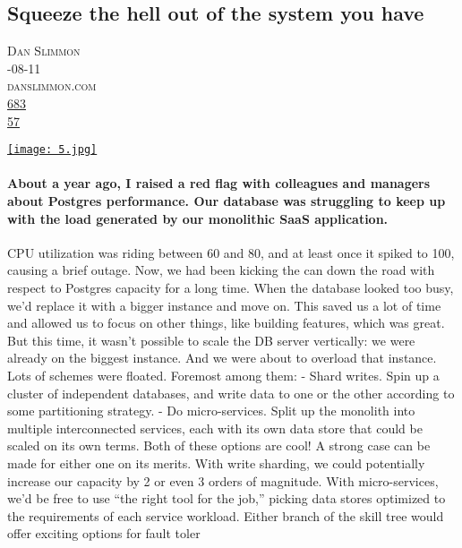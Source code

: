 \documentclass[10pt,a4paper]{article}
\begin{document}
\subsection{Squeeze the hell out of the system you have}
\noindent\begin{minipage}[t]{0.20\linewidth}
\vspace{0pt}
\noindent\textsc{\footnotesize
{\scriptsize\faUser}\space 
Dan Slimmon \\
{\scriptsize\faCalendar}-08-11 \\
{\scriptsize\faGlobe}\space 
danslimmon.com \\
{\scriptsize\faThumbsOUp}\space 
\href{http://news.ycombinator.com/item?id=37091983\&utm\_term=comment}{683} \\
{\scriptsize\faComments}\space 
\href{http://news.ycombinator.com/item?id=37091983\&utm\_term=comment}{57} \\
}
\end{minipage} %
\begin{minipage}[t]{0.80\linewidth}
\vspace{0pt}
\begin{multicols}{2}

    \href{https://blog.danslimmon.com/2023/08/11/squeeze-the-hell-out-of-the-system-you-have/\#like-2777?utm\_source=hackernewsletter\&utm\_medium=email\&utm\_term=fav}{
        \texttt{[image: 5.jpg]}
    }
  
\paragraph{About a year ago, I raised a red flag with colleagues and managers about Postgres performance. Our database was struggling to keep up with the load generated by our monolithic SaaS application.}
 CPU utilization was riding between 60 and 80, and at least once it spiked to 100, causing a brief outage.
Now, we had been kicking the can down the road with respect to Postgres capacity for a long time. When the database looked too busy, we’d replace it with a bigger instance and move on. This saved us a lot of time and allowed us to focus on other things, like building features, which was great.
But this time, it wasn’t possible to scale the DB server vertically: we were already on the biggest instance. And we were about to overload that instance.
Lots of schemes were floated. Foremost among them:
- Shard writes. Spin up a cluster of independent databases, and write data to one or the other according to some partitioning strategy.
- Do micro-services. Split up the monolith into multiple interconnected services, each with its own data store that could be scaled on its own terms.
Both of these options are cool! A strong case can be made for either one on its merits. With write sharding, we could potentially increase our capacity by 2 or even 3 orders of magnitude. With micro-services, we’d be free to use “the right tool for the job,” picking data stores optimized to the requirements of each service workload. Either branch of the skill tree would offer exciting options for fault toler

\end{multicols}
\end{minipage}
\end{document}
